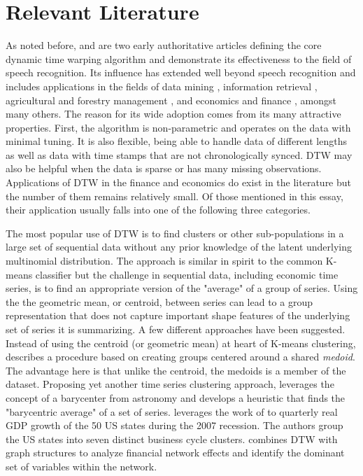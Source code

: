 \documentclass[12pt]{report}
\begin{document}
\section{Relevant Literature}

As noted before, \cite{SakoeChiba_IEEE_1978} and \cite{Itakura_1975} are two early authoritative articles defining the core dynamic time warping algorithm and demonstrate its effectiveness to the field of speech recognition. Its influence has extended well beyond speech recognition and includes applications in the fields of data mining \cite{Berndt1994, ElsingAgon2012, KotsifakosAthitsosPapapetrou_2011}, information retrieval \cite{Mueller2007}, agricultural and forestry management \cite{Chaves_et_all_2021_Brazil_Crop_id, Maus_et_al_2016, NarinO.G.2022URAN, QuXuzhou2023Mmls, XiaoXingyuan2023LCCU}, and economics and finance \cite{9145837_Entropic_DTW_Fin_Networks, Urso_et_al_2021, FrancesWiemann2020, HowardTalisAlexeev_2020, Ito_Sakemoto_2020, Mastroeni_et_al_2021, Raihan2017, WAN2017151, WangXieHanSun2012}, amongst many others. The reason for its wide adoption comes from its many attractive properties. First, the algorithm is non-parametric and operates on the data with minimal tuning. It is also flexible, being able to handle data of different lengths as well as data with time stamps that are not chronologically synced. DTW may also be helpful when the data is sparse or has many missing observations. Applications of DTW in the finance and economics do exist in the literature but the number of them remains relatively small. Of those mentioned in this essay, their application usually falls into one of the following three categories.

The most popular use of DTW is to find clusters or other sub-populations in a large set of sequential data without any prior knowledge of the latent underlying multinomial distribution. The approach is similar in spirit to the common K-means classifier but the challenge in sequential data, including economic time series, is to find an appropriate version of the "average" of a group of series. Using the the geometric mean, or centroid, between series can lead to a group representation that does not capture important shape features of the underlying set of series it is summarizing. A few different approaches have been suggested. Instead of using the centroid (or geometric mean) at heart of K-means clustering, \cite{Urso_et_al_2021} describes a procedure based on creating groups centered around a shared \textit{medoid}. The advantage here is that unlike the centroid, the medoids is a member of the dataset. Proposing yet another time series clustering approach, \cite{PETITJEAN2011678} leverages the concept of a barycenter from astronomy and develops a heuristic that finds the "barycentric average" of a set of series. \cite{FrancesWiemann2020} leverages the work of \cite{PETITJEAN2011678} to quarterly real GDP growth of the 50 US states during the 2007 recession. The authors group the US states into seven distinct business cycle clusters. \cite{9145837_Entropic_DTW_Fin_Networks} combines DTW with graph structures to analyze financial network effects and identify the dominant set of variables within the network.
\end{document}
